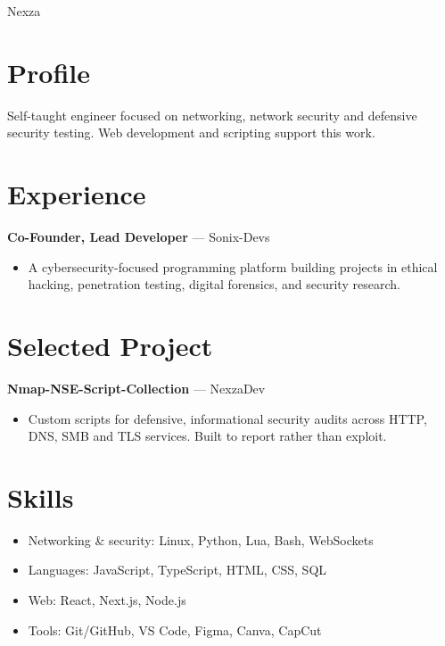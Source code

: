 \documentclass{article}
\begin{document}
\begin{center}\LARGE Nexza\end{center}
\section*{Profile}
Self-taught engineer focused on networking, network security and defensive security testing. Web development and scripting support this work.

\section*{Experience}
\textbf{Co-Founder, Lead Developer} — Sonix-Devs\\
\begin{itemize}\item A cybersecurity-focused programming platform building projects in ethical hacking, penetration testing, digital forensics, and security research.\end{itemize}

\section*{Selected Project}
\textbf{Nmap-NSE-Script-Collection} — NexzaDev\\
\begin{itemize}\item Custom scripts for defensive, informational security audits across HTTP, DNS, SMB and TLS services. Built to report rather than exploit.\end{itemize}

\section*{Skills}
\begin{itemize}
\item Networking \& security: Linux, Python, Lua, Bash, WebSockets
\item Languages: JavaScript, TypeScript, HTML, CSS, SQL
\item Web: React, Next.js, Node.js
\item Tools: Git/GitHub, VS Code, Figma, Canva, CapCut
\end{itemize}
\end{document}
